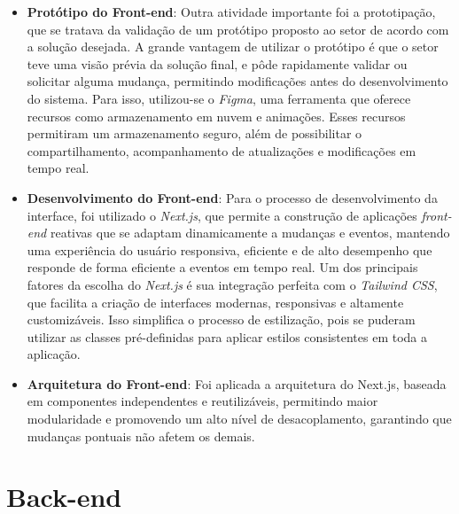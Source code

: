 \begin{itemize}
    \item \textbf{Protótipo do Front-end}: Outra atividade importante foi a prototipação, que se tratava da validação de um protótipo proposto ao setor de acordo com a solução desejada. A grande vantagem de utilizar o protótipo é que o setor teve uma visão prévia da solução final, e pôde rapidamente validar ou solicitar alguma mudança, permitindo modificações antes do desenvolvimento do sistema. Para isso, utilizou-se o \textit{Figma}, uma ferramenta que oferece recursos como armazenamento em nuvem e animações. Esses recursos permitiram um armazenamento seguro, além de possibilitar o compartilhamento, acompanhamento de atualizações e modificações em tempo real.
    
    \item \textbf{Desenvolvimento do Front-end}: Para o processo de desenvolvimento da interface, foi utilizado o \textit{Next.js}, que permite a construção de aplicações \textit{front-end} reativas que se adaptam dinamicamente a mudanças e eventos, mantendo uma experiência do usuário responsiva, eficiente e de alto desempenho que responde de forma eficiente a eventos em tempo real. Um dos principais fatores da escolha do \textit{Next.js} é sua integração perfeita com o \textit{Tailwind CSS}, que facilita a criação de interfaces modernas, responsivas e altamente customizáveis. Isso simplifica o processo de estilização, pois se puderam utilizar as classes pré-definidas para aplicar estilos consistentes em toda a aplicação.

    \item \textbf{Arquitetura do Front-end}: Foi aplicada a arquitetura do Next.js, baseada em componentes independentes e reutilizáveis, permitindo maior modularidade e promovendo um alto nível de desacoplamento, garantindo que mudanças pontuais não afetem os demais.
\end{itemize}

\section{Back-end}

